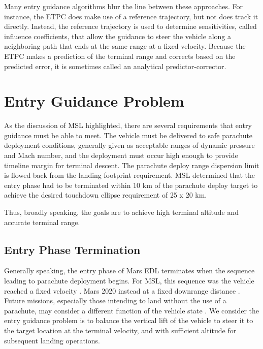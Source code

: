 Many entry guidance algorithms blur the line between these approaches. For instance, the ETPC does make use of a reference trajectory, but not does track it directly. Instead, the reference trajectory is used to determine sensitivities, called influence coefficients, that allow the guidance to steer the vehicle along a neighboring path that ends at the same range at a fixed velocity. Because the ETPC makes a prediction of the terminal range and corrects based on the predicted error, it is sometimes called an analytical predictor-corrector. 

\section{Entry Guidance Problem}
As the discussion of MSL highlighted, there are several requirements that entry guidance must be able to meet. 
The vehicle must be delivered to safe parachute deployment conditions, generally given as acceptable ranges of dynamic pressure and Mach number, and the deployment must occur high enough to provide timeline margin for terminal descent. The parachute deploy range dispersion limit is flowed back from the landing footprint requirement. MSL determined that the entry phase had to be terminated within 10 km of the parachute deploy target to achieve the desired touchdown ellipse requirement of 25 x 20 km. 

Thus, broadly speaking, the goals are to achieve high terminal altitude and accurate terminal range. 

\subsection{Entry Phase Termination}
Generally speaking, the entry phase of Mars EDL terminates when the sequence leading to parachute deployment begins. For MSL, this sequence was the vehicle reached a fixed velocity \cite{MSL_EDL2}. Mars 2020 instead at a fixed downrange distance \cite{TriggerComparison2020}. Future missions, especially those intending to land without the use of a parachute, may consider a different function of the vehicle state \cite{LuAdaptiveEDL,NoyesSRP}. 
We consider the entry guidance problem is to balance the vertical lift of the vehicle to steer it to the target location at the terminal velocity, and with sufficient altitude for subsequent landing operations. 


